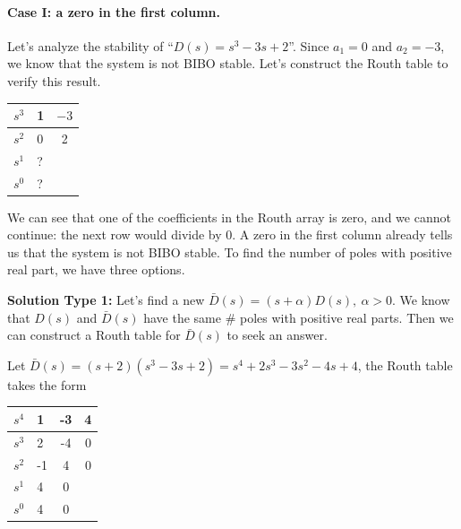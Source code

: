 \documentclass[twoside]{article}
\begin{document}
\paragraph{Case I: a zero in the first column.}

Let's analyze the stability of ``$D(s) = s^3 - 3 s + 2$''. 
Since $a_1 = 0$ and $a_2 = -3$, we know that the system
is not BIBO stable. Let's construct the Routh table to verify this result.

 \begin{minipage}[h]{1\linewidth}
\begin{center}
\begin{tabular}{|c || F || c  |}
\hline
$s^3$ & 1 & $-3$ 
\\ \hline
$s^2$ & 0 & 2
\\ \hline
$s^1$  & ? & 
\\ \hline
$s^0$  & ? & 
\\ \hline
\end{tabular}
\end{center}
  \end{minipage}

We can see that one of the coefficients in the Routh array is zero,
and we cannot continue: the next row would divide by $0$. A zero in the first column already
tells us that the system is not BIBO stable. To find the number of poles with positive real
part, we have three options.

\vspace{12pt}

\textbf{Solution Type 1:} Let's find a new $\bar{D}(s) = (s + \alpha)
D(s), \ \alpha > 0$. We know that $D(s)$ and $\bar{D}(s)$ have the same 
$\#$ poles with positive real parts. Then we can construct a Routh
table for $\bar{D}(s)$ to seek an answer. 

Let $\bar{D}(s) = (s + 2) ( s^3 - 3 s + 2) = s^4 + 2 s^3 - 3 s^2 - 4 s+ 4$, the Routh table takes the form

%

\begin{center}
\begin{tabular}{|c || F || c c |}
\hline
$s^4$ & 1 & -3 & 4 
\\ \hline
$s^3$ & 2 & -4 & 0
\\ \hline
$s^2$ & -1 & 4 & 0
\\ \hline
$s^1$ & 4 & 0 &
\\ \hline
$s^0$ & 4 & 0 & 
\\ \hline
\end{tabular}
\end{center}
\end{document}

